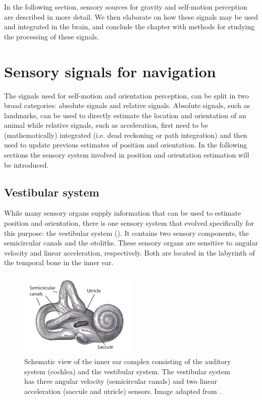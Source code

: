 In the following section, sensory sources for gravity and self-motion perception are described in more detail. We then elaborate on how these signals may be used and integrated in the brain, and conclude the chapter with methods for studying the processing of these signals. 
 


\section{Sensory signals for navigation}

The signals used for self-motion and orientation perception, can be split in two broad categories: absolute signals and relative signals. Absolute signals, such as landmarks, can be used to directly estimate the location and orientation of an animal while relative signals, such as acceleration, first need to be (mathematically) integrated (i.e. dead reckoning or path integration) and then used to update previous estimates of position and orientation. In the following sections the sensory system involved in position and orientation estimation will be introduced.

\subsection{Vestibular system}

While many sensory organs supply information that can be used to estimate position and orientation, there is one sensory system that evolved specifically for this purpose: the vestibular system (). It contains two sensory components, the semicircular canals and the otoliths. These sensory organs are sensitive to angular velocity and linear acceleration, respectively. Both are located in the labyrinth of the temporal bone in the inner ear.

\begin{figure}
    \includegraphics[width=0.5\textwidth]{src/intro/figures/vestibular.pdf}
    \caption{Schematic view of the inner ear complex consisting of the auditory system (cochlea) and the vestibular system. The vestibular system has three angular velocity (semicircular canals) and two linear acceleration (saccule and utricle) sensors. Image adapted from \protect{}.}
    \label{intro:vestibular}
\end{figure}


